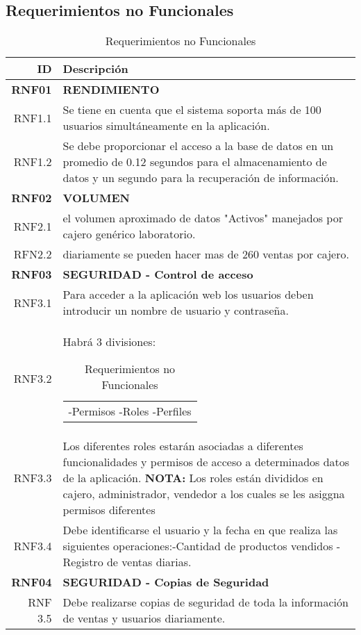 \documentclass[a4paper,11pt, spanish]{report}
\makeatletter
\newcommand{\celda}[3][t]{%
  \begin{tabular}[#1]{@{}#2@{}}#3\end{tabular}}
\makeatother
\begin{document}
{{{{{{{{{{{{    \subsection{Requerimientos no Funcionales}
      {\renewcommand{\arraystretch}{1.25}%
      \begin{table}[H]
      \begin{tabularx}{\textwidth}{r|X}
      \textbf{\Large ID} & \textbf{\Large Descripción}\\\hline
      \textbf{\large RNF01} & \textbf{\large RENDIMIENTO}\\
      RNF1.1 & Se tiene en cuenta que el sistema soporta más de 100 usuarios simultáneamente en la aplicación.\\
      RNF1.2 & Se debe proporcionar el acceso a la base de datos en un promedio de 0.12 segundos para el almacenamiento de datos y un segundo para la recuperación de información.\\ \hline
      \textbf{\large RNF02} & \textbf{\large VOLUMEN}\\
      RNF2.1 & el volumen aproximado de datos "Activos" manejados por cajero genérico laboratorio.\\
      RFN2.2 & diariamente se pueden hacer mas de 260 ventas por cajero.\\\hline
      \textbf{\large RNF03} & \textbf{\large SEGURIDAD - Control de acceso}\\
      RNF3.1 & Para acceder a la aplicación web los usuarios deben introducir un nombre de usuario y contraseña.\\
      RNF3.2 & Habrá 3 divisiones:\celda{l}{\newline -Permisos \newline -Roles \newline -Perfiles}\\
      RNF3.3 & Los diferentes roles estarán asociadas a diferentes funcionalidades y permisos de acceso a determinados datos de la aplicación.\newline
      \textbf{NOTA:} Los roles están divididos en cajero, administrador, vendedor a los cuales se les asiggna permisos diferentes\\
      RNF3.4 & Debe identificarse el usuario y la fecha en que realiza las siguientes  operaciones:\newline -Cantidad de productos vendidos \newline -Registro de ventas diarias.\\ \hline
      \textbf{\large RNF04} & \textbf{\large SEGURIDAD - Copias de Seguridad}\\
      RNF 3.5 & Debe realizarse copias de seguridad de toda la información de ventas y usuarios diariamente.\\
      \end{tabularx}
      \caption{Requerimientos no Funcionales}
      \end{table}
    
}}}}}}}}}}}}}
\end{document}
